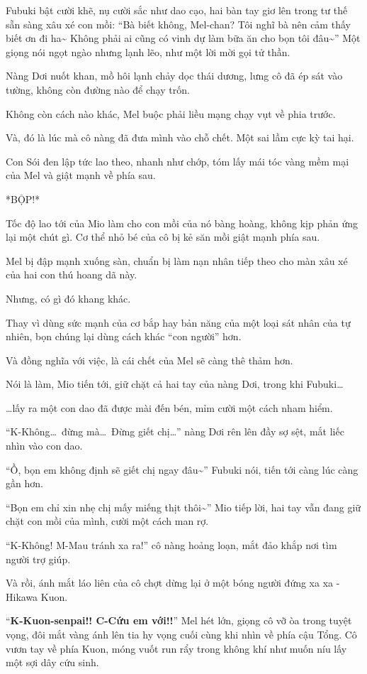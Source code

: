 \documentclass[../main.tex]{subfiles}
\begin{document}
Fubuki bật cười khẽ, nụ cười sắc như dao cạo, hai bàn tay giơ lên trong tư thế sẵn sàng xâu xé con mồi: ``Bà biết không, Mel-chan? Tôi nghĩ bà nên cảm thấy biết ơn đi ha\~{} Không phải ai cũng có vinh dự làm bữa ăn cho bọn tôi đâu\~{}'' Một giọng nói ngọt ngào nhưng lạnh lẽo, như một lời mời gọi tử thần.

Nàng Dơi nuốt khan, mồ hôi lạnh chảy dọc thái dương, lưng cô đã ép sát vào tường, không còn đường nào để chạy trốn.

Không còn cách nào khác, Mel buộc phải liều mạng chạy vụt về phia trước.

Và, đó là lúc mà cô nàng đã đưa mình vào chỗ chết. Một sai lầm cực kỳ tai hại.

Con Sói đen lập tức lao theo, nhanh như chớp, tóm lấy mái tóc vàng mềm mại của Mel và giật mạnh về phía sau.

*BỘP!*

Tốc độ lao tới của Mio làm cho con mồi của nó bàng hoàng, không kịp phản ứng lại một chút gì. Cơ thể nhỏ bé của cô bị kẻ săn mồi giật mạnh phía sau.

Mel bị đập mạnh xuống sàn, chuẩn bị làm nạn nhân tiếp theo cho màn xâu xé của hai con thú hoang dã này.

Nhưng, có gì đó khang khác.

Thay vì dùng sức mạnh của cơ bắp hay bản năng của một loại sát nhân của tự nhiên, bọn chúng lại dùng cách khác ``con người'' hơn.

Và đồng nghĩa với việc, là cái chết của Mel sẽ càng thê thảm hơn.

Nói là làm, Mio tiến tới, giữ chặt cả hai tay của nàng Dơi, trong khi Fubuki\dots

\dots lấy ra một con dao đã được mài đến bén, mỉm cười một cách nham hiểm.

``K-Không\dots\ đừng mà\dots\ Đừng giết chị\dots'' nàng Dơi rên lên đầy sợ sệt, mắt liếc nhìn vào con dao.

``Ồ, bọn em không định sẽ giết chị ngay đâu\~{}'' Fubuki nói, tiến tới càng lúc càng gần hơn.

``Bọn em chỉ xin nhẹ chị mấy miếng thịt thôi\~{}'' Mio tiếp lời, hai tay vẫn đang giữ chặt con mồi của mình, cười một cách man rợ.

``K-Không! M-Mau tránh xa ra!'' cô nàng hoảng loạn, mắt đảo khắp nơi tìm người trợ giúp.

Và rồi, ánh mắt láo liên của cô chợt dừng lại ở một bóng người đứng xa xa - Hikawa Kuon.

``\textbf{K-Kuon-senpai!! C-Cứu em với!!}'' Mel hét lớn, giọng cô vỡ òa trong tuyệt vọng, đôi mắt vàng ánh lên tia hy vọng cuối cùng khi nhìn về phía cậu Tổng. Cô vươn tay về phía Kuon, móng vuốt run rẩy trong không khí như muốn níu lấy một sợi dây cứu sinh.
\end{document}
